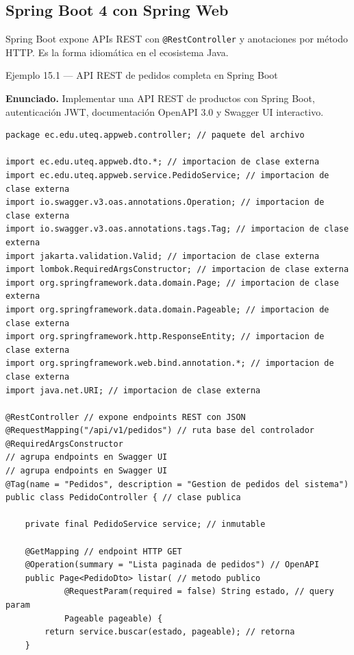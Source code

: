 \subsection{Spring Boot 4 con Spring Web}

Spring Boot expone APIs REST con \texttt{@RestController} y
anotaciones por método HTTP. Es la forma idiomática en el ecosistema
Java.


\begin{cajaejemplo}{Ejemplo 15.1 --- API REST de pedidos completa en Spring Boot}

\textbf{Enunciado.} Implementar una API REST de productos con Spring Boot, autenticación JWT, documentación OpenAPI 3.0 y Swagger UI interactivo.

\begin{lstlisting}[style=java,caption={PedidoController.java},label=lst:15.2]
package ec.edu.uteq.appweb.controller; // paquete del archivo

import ec.edu.uteq.appweb.dto.*; // importacion de clase externa
import ec.edu.uteq.appweb.service.PedidoService; // importacion de clase externa
import io.swagger.v3.oas.annotations.Operation; // importacion de clase externa
import io.swagger.v3.oas.annotations.tags.Tag; // importacion de clase externa
import jakarta.validation.Valid; // importacion de clase externa
import lombok.RequiredArgsConstructor; // importacion de clase externa
import org.springframework.data.domain.Page; // importacion de clase externa
import org.springframework.data.domain.Pageable; // importacion de clase externa
import org.springframework.http.ResponseEntity; // importacion de clase externa
import org.springframework.web.bind.annotation.*; // importacion de clase externa
import java.net.URI; // importacion de clase externa

@RestController // expone endpoints REST con JSON
@RequestMapping("/api/v1/pedidos") // ruta base del controlador
@RequiredArgsConstructor
// agrupa endpoints en Swagger UI
// agrupa endpoints en Swagger UI
@Tag(name = "Pedidos", description = "Gestion de pedidos del sistema")
public class PedidoController { // clase publica

    private final PedidoService service; // inmutable

    @GetMapping // endpoint HTTP GET
    @Operation(summary = "Lista paginada de pedidos") // OpenAPI
    public Page<PedidoDto> listar( // metodo publico
            @RequestParam(required = false) String estado, // query param
            Pageable pageable) {
        return service.buscar(estado, pageable); // retorna
    }


\end{lstlisting}
\end{cajaejemplo}
